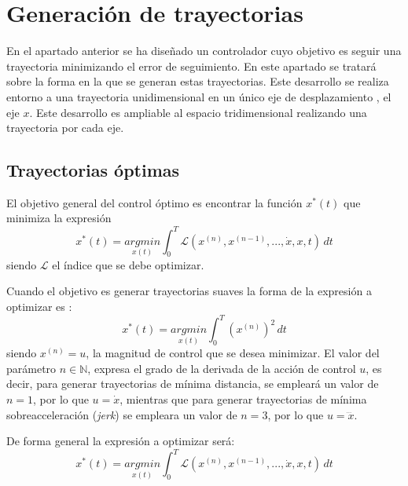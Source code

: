 \chapter{Generación de trayectorias}

En el apartado anterior se ha diseñado un controlador cuyo objetivo es seguir una trayectoria  minimizando el error de seguimiento. En este apartado se tratará sobre la forma en la que se generan estas trayectorias. Este desarrollo se realiza entorno a una trayectoria unidimensional en un único eje de desplazamiento , el eje $x$. Este desarrollo es ampliable al espacio tridimensional realizando una trayectoria por cada eje.


\section{Trayectorias óptimas}\label{trajectoriasoptimas:cap}
El objetivo general del control óptimo es encontrar la función $x^*(t)$ que minimiza la expresión
\begin{equation}
	x^*(t) =  \underset{x(t)}{argmin}\int_{0}^{T}\mathcal{L}\left(x^{(n)},x^{(n-1)},...,\dot{x},x,t\right)\, dt
\end{equation}
siendo $\mathcal{L}$ el índice que se debe optimizar.

Cuando el objetivo es generar trayectorias suaves la forma de la expresión a optimizar es :
\begin{equation}
	x^*(t) = \underset{x(t)}{argmin}\int_{0}^{T}\left(x^{(n)}\right)^2\, dt
\end{equation}
siendo $x^{(n)} = u $, la magnitud de control que se desea minimizar. El valor del parámetro $n\in\mathbb{N}$, expresa el grado de la derivada de la acción de control $u$, es decir, para generar trayectorias de mínima distancia, se empleará un valor de $n=1$, por lo que $u = \dot{x}$, mientras que para generar trayectorias de mínima sobreacceleración (\textit{jerk}) se empleara un valor de $n=3$, por lo que $u = \dddot{x}$.

De forma general la expresión a optimizar será:
	\begin{equation}
		x^*(t) = \underset{x(t)}{argmin}\int_{0}^{T}\mathcal{L}\left(x^{(n)}, x^{(n-1)},...,\dot{x},x,t\right)\, dt
	\end{equation}

